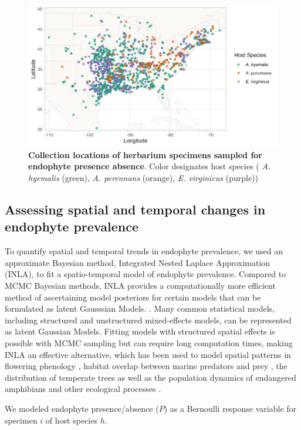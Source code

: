 \documentclass[11pt]{article}
\begin{document}
\begin{figure}[H]
	\centering
	\includegraphics[width = \linewidth]{collections_map.png}
	\caption{\textbf{Collection locations of herbarium specimens sampled for endophyte presence absence}. Color designates host species ( \emph{A. hyemalis} (green), \emph{A. perennans} (orange), \emph{E. virginicus} (purple))}
\end{figure}


\subsection*{Assessing spatial and temporal changes in endophyte prevalence}
To quantify spatial and temporal trends in endophyte prevalence, we used an approximate Bayesian method, Integrated Nested Laplace Approximation (INLA), to fit a spatio-temporal model of endophyte prevalence.
Compared to MCMC Bayesian methods, INLA provides a computationally more efficient method of ascertaining model posteriors for certain models that can be formulated as latent Gausssian Models.  \cite{rue2009approximate}. 
Many common statistical models, including structured and unstructured mixed-effects models, can be represented as latent Gaussian Models. 
Fitting models with structured spatial effects is possible with MCMC sampling but can require long computation times, making INLA an effective alternative, which has been used to model spatial patterns in flowering phenology \cite{willems2022forest}, habitat overlap between marine predators and prey \cite{sadykova2017bayesian}, the distribution of temperate trees \cite{engel2022spatial} as well as the population dynamics of endangered amphibians \cite{knapp2016large} and other ecological processes \cite{beguin2012hierarchical}.

We modeled endophyte presence/absence ($P$) as a Bernoulli response variable for specimen $i$ of host species $h$.
\end{document}
